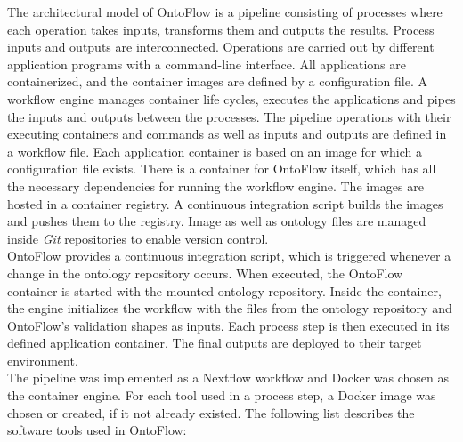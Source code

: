 \documentclass[runningheads]{llncs}
\begin{document}
The architectural model of OntoFlow is a pipeline consisting of processes where each operation takes inputs, transforms them and outputs the results. Process inputs and outputs are interconnected. Operations are carried out by different application programs with a command-line interface. All applications are containerized, and the container images are defined by a configuration file. A workflow engine manages container life cycles, executes the applications and pipes the inputs and outputs between the processes. The pipeline operations with their executing containers and commands as well as inputs and outputs are defined in a workflow file. Each application container is based on an image for which a configuration file exists. There is a container for OntoFlow itself, which has all the necessary dependencies for running the workflow engine. The images are hosted in a container registry. A continuous integration script builds the images and pushes them to the registry. Image as well as ontology files are managed inside \textit{Git} repositories to enable version control.\\
OntoFlow provides a continuous integration script, which is triggered whenever a change in the ontology repository occurs. When executed, the OntoFlow container is started with the mounted ontology repository. Inside the container, the engine initializes the workflow with the files from the ontology repository and OntoFlow's validation shapes as inputs. Each process step is then executed in its defined application container. The final outputs are deployed to their target environment.\\
The pipeline was implemented as a Nextflow \cite{Tommaso} workflow and Docker was chosen as the container engine. For each tool used in a process step, a Docker image was chosen or created, if it not already existed. The following list describes the software tools used in OntoFlow:
\end{document}
